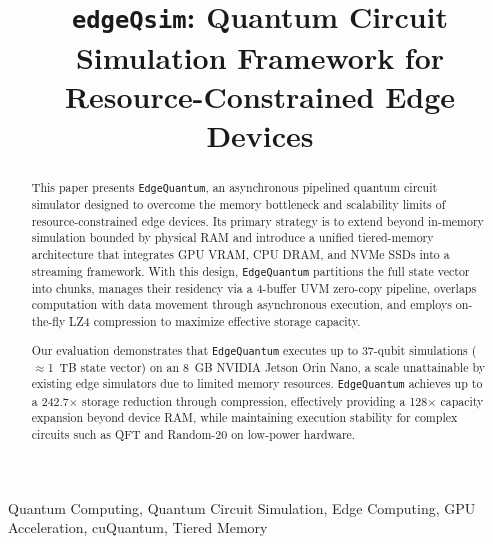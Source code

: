 \documentclass[journal]{IEEEtran}
\newcommand{\edgeQsim}{\texttt{edgeQsim}\xspace}
\newcommand{\EdgeQuantum}{\texttt{EdgeQuantum}\xspace}
\begin{document}
\title{\edgeQsim: Quantum Circuit Simulation Framework for Resource-Constrained Edge Devices}


\maketitle
\begin{abstract}
This paper presents \EdgeQuantum, an asynchronous pipelined quantum circuit simulator designed to overcome the memory bottleneck and scalability limits of resource-constrained edge devices. 
Its primary strategy is to extend beyond in-memory simulation bounded by physical RAM and introduce a unified tiered-memory architecture that integrates GPU VRAM, CPU DRAM, and NVMe SSDs into a streaming framework. 
With this design, \EdgeQuantum partitions the full state vector into chunks, manages their residency via a 4-buffer UVM zero-copy pipeline, overlaps computation with data movement through asynchronous execution, and employs on-the-fly LZ4 compression to maximize effective storage capacity.

Our evaluation demonstrates that \EdgeQuantum executes up to 37-qubit simulations ($\approx$1~TB state vector) on an 8~GB NVIDIA Jetson Orin Nano, a scale unattainable by existing edge simulators due to limited memory resources. 
\EdgeQuantum achieves up to a 242.7$\times$ storage reduction through compression, effectively providing a 128$\times$ capacity expansion beyond device RAM, while maintaining execution stability for complex circuits such as QFT and Random-20 on low-power hardware.
\end{abstract}

\begin{IEEEkeywords}
Quantum Computing, Quantum Circuit Simulation, Edge Computing, GPU Acceleration, cuQuantum, Tiered Memory
\end{IEEEkeywords}













\end{document}
